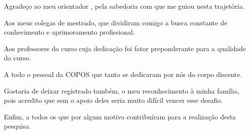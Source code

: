 \begin{agradecimentos}
Agradeço ao meu orientador \imprimirorientador, pela sabedoria com que me guiou nesta trajetória.

Aos meus colegas de mestrado, que dividiram comigo a busca constante de conhecimento e aprimoramento profissional.

Aos professores do curso cuja dedicação foi fator preponderante para a qualidade do curso.

A todo o pessoal da COPOS que tanto se dedicaram por nós do corpo discente.

Gostaria de deixar registrado também, o meu reconhecimento à minha família, pois acredito que sem o apoio deles seria muito difícil vencer esse desafio.

Enfim, a todos os que por algum motivo contribuíram para a realização desta pesquisa.

\end{agradecimentos}
